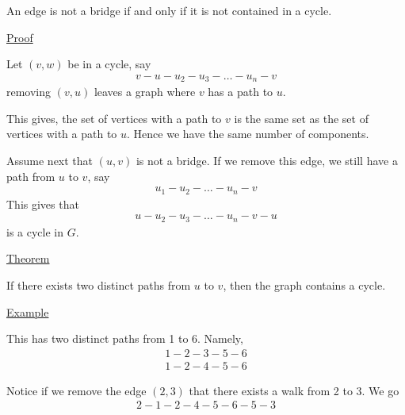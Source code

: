 \documentclass{article}
\begin{document}
An edge is not a bridge if and only if it is not contained in a cycle. 

\underline{Proof}

Let $(v,w)$ be in a cycle, say
\begin{align*}
    v-u-u_2-u_3-\ldots-u_n-v
\end{align*}
removing $(v,u)$ leaves a graph where $v$ has a path to $u$. 

This gives, the set of vertices with a path to $v$ is the same set as the set of vertices with a path to $u$. Hence we have the same number of components. 

Assume next that $(u,v)$ is not a bridge. If we remove this edge, we still have a path from $u$ to $v$, say
\begin{align*}
    u_1-u_2-\ldots-u_n-v
\end{align*}
This gives that
\begin{align*}
    u-u_2-u_3-\ldots-u_n-v-u
\end{align*}
is a cycle in $G$.

\underline{Theorem}

If there exists two distinct paths from $u$ to $v$, then the graph contains a cycle. 

\underline{Example}

\begin{center}
\end{center}

This has two distinct paths from 1 to 6. Namely, 
\begin{align*}
    1-2-3-5-6\\
    1-2-4-5-6
\end{align*}

Notice if we remove the edge $(2,3)$ that there exists a walk from 2 to 3. We go
\begin{align*}
    2-1-2-4-5-6-5-3
\end{align*}
\end{document}
